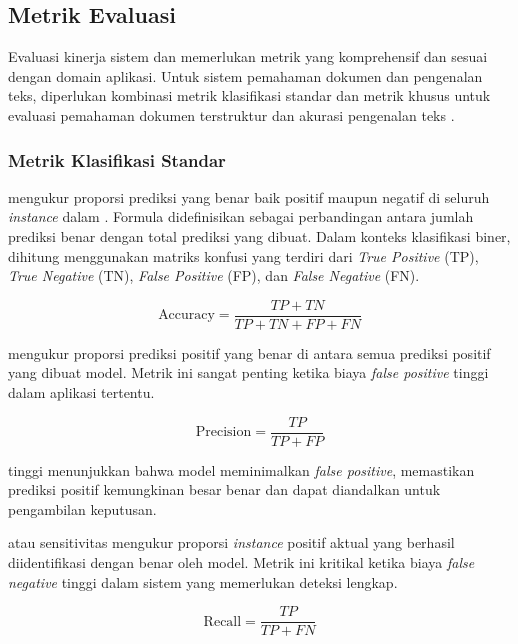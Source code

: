 \subsection{Metrik Evaluasi}
\label{subsec:metrik-evaluasi}

Evaluasi kinerja sistem \cv dan \ml memerlukan metrik yang komprehensif dan sesuai dengan domain aplikasi. Untuk sistem pemahaman dokumen dan pengenalan teks, diperlukan kombinasi metrik klasifikasi standar dan metrik khusus untuk evaluasi pemahaman dokumen terstruktur dan akurasi pengenalan teks \parencite{rice1996ocr}.

\subsubsection{Metrik Klasifikasi Standar}

\accuracy mengukur proporsi prediksi yang benar baik positif maupun negatif di seluruh \emph{instance} dalam \dataset. Formula \accuracy didefinisikan sebagai perbandingan antara jumlah prediksi benar dengan total prediksi yang dibuat. Dalam konteks klasifikasi biner, \accuracy dihitung menggunakan matriks konfusi yang terdiri dari \emph{True Positive} (TP), \emph{True Negative} (TN), \emph{False Positive} (FP), dan \emph{False Negative} (FN).

\begin{equation}
\text{Accuracy} = \frac{TP + TN}{TP + TN + FP + FN}
\end{equation}

\precision mengukur proporsi prediksi positif yang benar di antara semua prediksi positif yang dibuat model. Metrik ini sangat penting ketika biaya \emph{false positive} tinggi dalam aplikasi tertentu.

\begin{equation}
\text{Precision} = \frac{TP}{TP + FP}
\end{equation}

\precision tinggi menunjukkan bahwa model meminimalkan \emph{false positive}, memastikan prediksi positif kemungkinan besar benar dan dapat diandalkan untuk pengambilan keputusan.

\recall atau sensitivitas mengukur proporsi \emph{instance} positif aktual yang berhasil diidentifikasi dengan benar oleh model. Metrik ini kritikal ketika biaya \emph{false negative} tinggi dalam sistem yang memerlukan deteksi lengkap.

\begin{equation}
\text{Recall} = \frac{TP}{TP + FN}
\end{equation}

